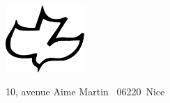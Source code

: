 \begin{titlepage}
\begin{center}
\mbox{}
\vfill
{}
\vfill
\enlargethispage{\footskip}
\includegraphics[width=3cm]{colombe.pdf}

10, avenue Aime Martin \mybullet~06220~Nice
\end{center}
\end{titlepage}
\pagebreak

